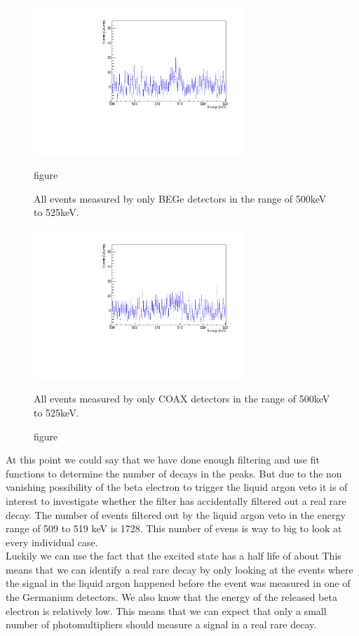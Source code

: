 \begin{figure}[ht]
\centering
\begin{minipage}{.5\textwidth}
  \centering
	\includegraphics[width=80mm]{./Bilder/500525LArVetoBEGes.pdf}
  \caption{figure}{All events measured by only BEGe detectors in the range of 500keV to 525keV.}
  \label{fig:test1}
\end{minipage}%
\begin{minipage}{.5\textwidth}
  \centering
	\includegraphics[width=80mm]{./Bilder/500525LArVetoCOAX.pdf}
  \caption{figure}{All events measured by only COAX detectors in the range of 500keV to 525keV.}
  \label{fig:test2}
\end{minipage}
\end{figure}

At this point we could say that we have done enough filtering and use fit functions to determine the number of decays in the peaks.
But due to the non vanishing possibility of the beta electron to trigger the liquid argon veto it is of interest to investigate whether the filter has accidentally filtered out a real rare  decay.
The number of events filtered out by the liquid argon veto in the energy range of 509 to 519 keV is 1728.
This number of evens is way to big to look at every individual case.
\\

Luckily we can use the fact that the excited  state has a half life of about %
This means that we can identify a real rare  decay by only looking at the events where the signal in the liquid argon happened before the event was measured in one of the Germanium detectors.
We also know that the energy of the released beta electron is relatively low.
This means that we can expect that only a small number of photomultipliers should measure a signal in a real rare  decay.
\\


